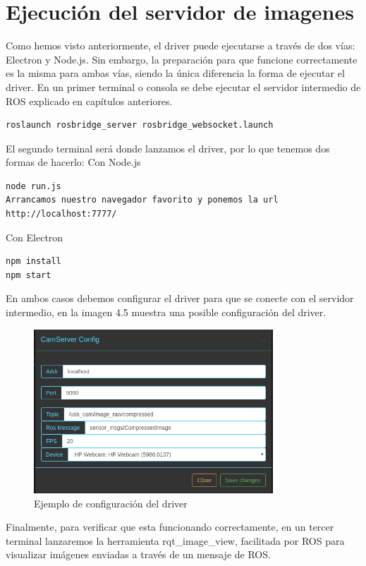 \section{Ejecución del servidor de imagenes}
Como hemos visto anteriormente, el driver puede ejecutarse a través de dos vías: Electron y Node.js. Sin embargo, la preparación para que funcione correctamente es la misma para ambas vías, siendo la única diferencia la forma de ejecutar el driver.
En un primer terminal o consola se debe ejecutar el servidor intermedio de ROS explicado en capítulos anteriores.
\begin{lstlisting}[frame=single]
roslaunch rosbridge_server rosbridge_websocket.launch
\end{lstlisting}
El segundo terminal será donde lanzamos el driver, por lo que tenemos dos formas de hacerlo:
Con Node.js
\begin{lstlisting}[frame=single]
node run.js
Arrancamos nuestro navegador favorito y ponemos la url http://localhost:7777/
\end{lstlisting}
Con Electron
\begin{lstlisting}[frame=single]
npm install
npm start
\end{lstlisting}
En ambos casos debemos configurar el driver para que se conecte con el servidor intermedio, en la imagen 4.5 muestra una posible configuración del driver.
\begin{figure}[H]
  \begin{center}
    \includegraphics[width=0.8\textwidth]{figures/configcamservertest.png}
		\caption{Ejemplo de configuración del driver}
		\label{fig.esquemacamserver}
		\end{center}
\end{figure}
Finalmente, para verificar que esta funcionando correctamente, en un tercer terminal lanzaremos la herramienta rqt\_image\_view, facilitada por ROS para visualizar imágenes enviadas a través de un mensaje de ROS.
